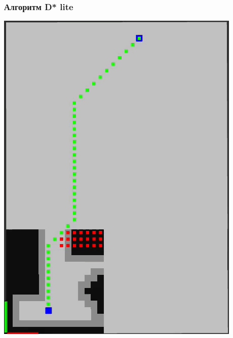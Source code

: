 \documentclass{beamer}
\begin{document}
    \begin{frame}[fragile]
        \frametitle{Алгоритм D* lite}
        \begin{center}
            \includegraphics[height=.75\textheight]{../figures/dstar8cells}
        \end{center}

    \end{frame}
\end{document}

